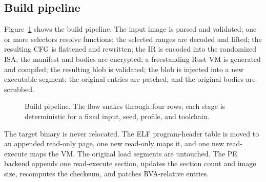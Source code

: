 \subsection{Build pipeline}

Figure~\ref{fig:pipeline} shows the build pipeline. The input image is parsed and
validated; one or more selectors resolve functions; the selected ranges are
decoded and lifted; the resulting CFG is flattened and rewritten; the IR is
encoded into the randomized ISA; the manifest and bodies are encrypted; a
freestanding Rust VM is generated and compiled; the resulting blob is validated;
the blob is injected into a new executable segment; the original entries are
patched; and the original bodies are scrubbed.

\begin{figure}[htbp]
\centering
{}
\caption{Build pipeline. The flow snakes through four rows; each stage is
deterministic for a fixed input, seed, profile, and toolchain.}
\label{fig:pipeline}
\end{figure}

The target binary is never relocated. The ELF program-header table is moved to
an appended read-only page, one new read-only  maps it, and one
new read-execute  maps the VM. The original load segments are
untouched. The PE backend appends one read-execute section, updates the section
count and image size, recomputes the checksum, and patches RVA-relative entries.

